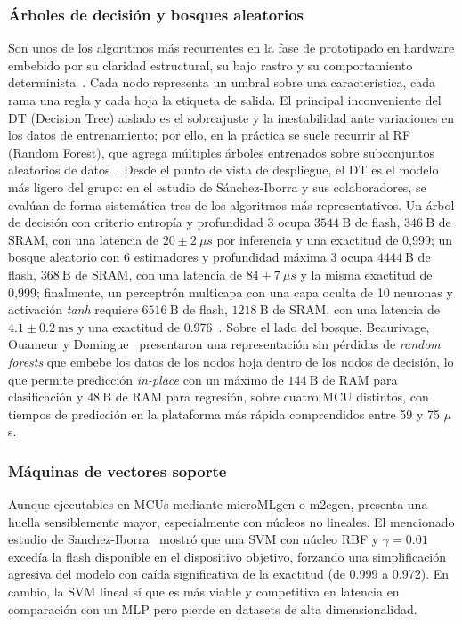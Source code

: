 \documentclass[a4paper,12pt,twoside,final]{book}
\begin{document}
\subsubsection{Árboles de decisión y bosques aleatorios}
Son unos de los algoritmos más recurrentes en la fase de prototipado en hardware embebido por su claridad estructural,
su bajo rastro y su comportamiento determinista~\cite{beaurivage2025ieeeles,dao2022eai,sanchez-iborra2022informatica,
talaat2022neural}. Cada nodo representa un umbral sobre una característica, cada rama una regla y cada hoja la
etiqueta de salida. El principal inconveniente del DT (Decision Tree) aislado es el sobreajuste y la inestabilidad
ante variaciones en los datos de entrenamiento; por ello, en la práctica se suele recurrir al RF (Random Forest), que
agrega múltiples árboles entrenados sobre subconjuntos aleatorios de datos~\cite{dao2022eai,talaat2022neural}. Desde
el punto de vista de despliegue, el DT es el modelo más ligero del grupo: en el estudio de Sánchez-Iborra y sus
colaboradores, se evalúan de forma sistemática tres de los algoritmos más representativos. Un árbol de decisión con
criterio entropía y profundidad 3 ocupa $3544~\mathrm{B}$ de flash, $346~\mathrm{B}$ de SRAM, con una latencia de
$20\pm 2~\mu s$ por inferencia y una exactitud de 0,999; un bosque aleatorio con 6 estimadores y profundidad máxima 3
ocupa $4444~\mathrm{B}$ de flash, $368~\mathrm{B}$ de SRAM, con una latencia de $84\pm 7~\mu s$ y la misma exactitud
de 0,999; finalmente, un perceptrón multicapa con una capa oculta de 10 neuronas y activación \textit{tanh} requiere
$6516~\mathrm{B}$ de flash, $1218~\mathrm{B}$ de SRAM, con una latencia de $4.1\pm 0.2~\mathrm{ms}$ y una exactitud
de 0.976~\cite{sanchez-iborra2022informatica}. Sobre el lado del bosque, Beaurivage, Ouameur y
Domingue~\cite{beaurivage2025ieeeles} presentaron una representación sin pérdidas de \textit{random forests} que
embebe los datos de los nodos hoja dentro de los nodos de decisión, lo que permite predicción \textit{in-place} con
un máximo de $144~\mathrm{B}$ de RAM para clasificación y $48~\mathrm{B}$ de RAM para regresión, sobre cuatro MCU
distintos, con tiempos de predicción en la plataforma más rápida comprendidos entre 59 y 75 $\mu$s.

\subsubsection{Máquinas de vectores soporte}
Aunque ejecutables en MCUs mediante microMLgen o m2cgen, presenta una huella sensiblemente mayor, especialmente con
núcleos no lineales. El mencionado estudio de Sanchez-Iborra~\cite{sanchez-iborra2022informatica} mostró que una SVM
con núcleo RBF y $\gamma = 0.01$ excedía la flash disponible en el dispositivo objetivo, forzando una simplificación
agresiva del modelo con caída significativa de la exactitud (de 0.999 a 0.972). En cambio, la SVM lineal sí que es más
viable y competitiva en latencia en comparación con un MLP pero pierde en datasets de alta dimensionalidad.
\end{document}
